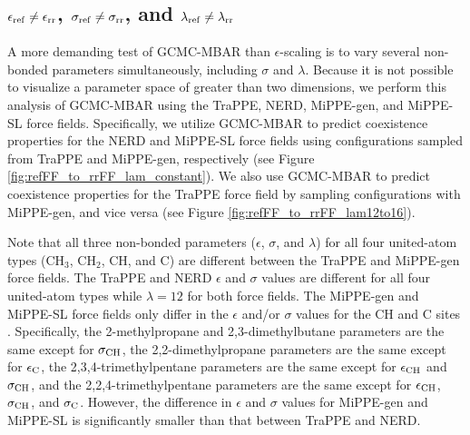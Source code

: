 \documentclass[journal=jced,manuscript=article]{achemso}
\begin{document}
 

\subsection{$\epsilon_{\rm ref} \neq \epsilon_{\rm rr}$, $\sigma_{\rm ref} \neq \sigma_{\rm rr}$, and $\lambda_{\rm ref} \neq \lambda_{\rm rr}$}

A more demanding test of GCMC-MBAR than $\epsilon$-scaling is to vary several non-bonded parameters simultaneously, including $\sigma$ and $\lambda$. Because it is not possible to visualize a parameter space of greater than two dimensions, we perform this analysis of GCMC-MBAR using the TraPPE, NERD, MiPPE-gen, and MiPPE-SL force fields. Specifically, we utilize GCMC-MBAR to predict coexistence properties for the NERD and MiPPE-SL force fields using configurations sampled from TraPPE and MiPPE-gen, respectively (see Figure \ref{fig:refFF_to_rrFF_lam_constant}). We also use GCMC-MBAR to predict coexistence properties for the TraPPE force field by sampling configurations with MiPPE-gen, and vice versa (see Figure \ref{fig:refFF_to_rrFF_lam12to16}). 

Note that all three non-bonded parameters ($\epsilon$, $\sigma$, and $\lambda$) for all four united-atom types (CH$_3$, CH$_2$, CH, and C) are different between the TraPPE and MiPPE-gen force fields. The TraPPE and NERD $\epsilon$ and $\sigma$ values are different for all four united-atom types while $\lambda = 12$ for both force fields. The MiPPE-gen and MiPPE-SL force fields only differ in the $\epsilon$ and/or $\sigma$ values for the CH and C sites . Specifically, the 2-methylpropane and 2,3-dimethylbutane parameters are the same except for $\sigma_{\rm CH}$, the 2,2-dimethylpropane parameters are the same except for $\epsilon_{\rm C}$, the 2,3,4-trimethylpentane parameters are the same except for $\epsilon_{\rm CH}$ and $\sigma_{\rm CH}$, and the 2,2,4-trimethylpentane parameters are the same except for $\epsilon_{\rm CH}$, $\sigma_{\rm CH}$, and $\sigma_{\rm C}$. However, the difference in $\epsilon$ and $\sigma$ values for MiPPE-gen and MiPPE-SL is significantly smaller than that between TraPPE and NERD.
\end{document}
